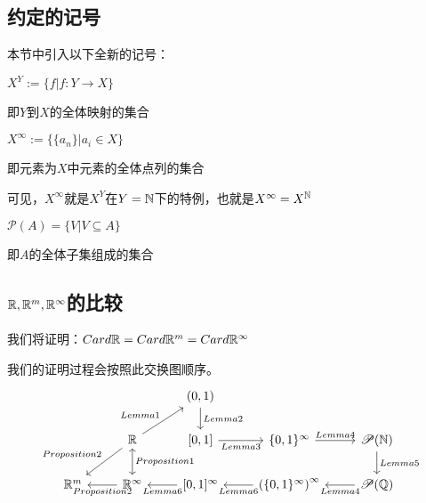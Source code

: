 \documentclass[12pt, a4paper, oneside, UTF8]{ctexbook}
\begin{document}
		\subsection{约定的记号}
			本节中引入以下全新的记号：
			\begin{para}{0}
					\begin{defn}{}{}
						$X^Y := \{f| f:Y \rightarrow X\}$
						
						即$Y$到$X$的全体映射的集合
					\end{defn}
					\begin{defn}{}{}
						$X^\infty := \{\{a_n\}| a_i\in X\}$
						
						即元素为$X$中元素的全体点列的集合
					\end{defn}
					可见，$X^\infty$就是$X^Y$在$Y=\mathbb{N}$下的特例，也就是$X^{\infty}=X^{\mathbb{N}}$
					\begin{defn}{}{}
						$\mathscr{P}(A) = \{V|V \subseteq A\}$
						
						即$A$的全体子集组成的集合
					\end{defn}
			\end{para}
			
		\subsection{\texorpdfstring{$\mathbb{R},\mathbb{R}^m,\mathbb{R}^\infty$}势的比较}
			我们将证明：$Card \mathbb{R} = Card \mathbb{R}^m = Card \mathbb{R}^\infty$
			
			我们的证明过程会按照此交换图顺序。
			\[\begin{tikzcd}
				&& {(0,1)} \\
				& {\mathbb{R}} & {[0,1]} & {\{0,1\}^{\infty}} & {\mathscr{P}(\mathbb{N})} \\
				{\mathbb{R}^m} & {\mathbb{R}^\infty} & {[0,1]^\infty} & {\left(\{0,1\}^{\infty}\right)^\infty} & {\mathscr{P}(\mathbb{Q})}
				\arrow["{Lemma2}", from=1-3, to=2-3]
				\arrow["{Lemma1}", from=2-2, to=1-3]
				\arrow["{Proposition2}"', from=2-2, to=3-1]
				\arrow["{Proposition1}", leftrightarrow, from=2-2, to=3-2]
				\arrow["{Lemma3}"', from=2-3, to=2-4]
				\arrow["{Lemma4}", from=2-4, to=2-5]
				\arrow["{Lemma5}", from=2-5, to=3-5]
				\arrow["{Proposition2}", from=3-2, to=3-1]
				\arrow["{Lemma6}", from=3-3, to=3-2]
				\arrow["{Lemma6}", from=3-4, to=3-3]
				\arrow["{Lemma4}", from=3-5, to=3-4]
			\end{tikzcd}\]
			
\end{document}
